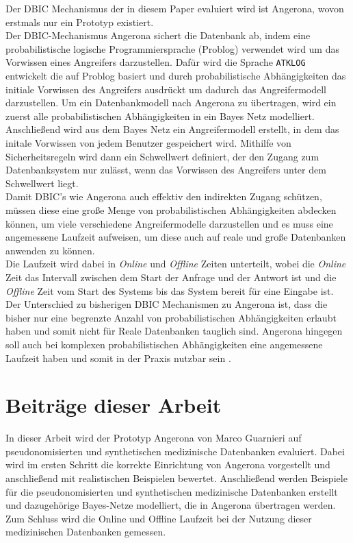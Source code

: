 \documentclass[german,version-2020-11]{uzl-thesis}
\begin{document}
Der DBIC Mechanismus der in diesem Paper evaluiert wird ist Angerona, wovon erstmals nur ein Prototyp existiert. \\ 
Der DBIC-Mechanismus Angerona sichert die Datenbank ab, indem eine probabilistische logische Programmiersprache (Problog) verwendet wird um das Vorwissen eines Angreifers darzustellen. Dafür wird die Sprache \texttt{ATKLOG} entwickelt die auf Problog basiert und durch probabilistische Abhängigkeiten das initiale Vorwissen des Angreifers ausdrückt um dadurch das Angreifermodell darzustellen. Um ein Datenbankmodell nach Angerona zu übertragen, wird ein zuerst alle probabilistischen Abhängigkeiten in ein Bayes Netz modelliert. Anschließend wird aus dem Bayes Netz ein Angreifermodell erstellt, in dem das initale Vorwissen von jedem Benutzer gespeichert wird. Mithilfe von Sicherheitsregeln wird dann ein Schwellwert definiert, der den Zugang zum Datenbanksystem nur zulässt, wenn das Vorwissen des Angreifers unter dem Schwellwert liegt. \\  
Damit DBIC's wie Angerona auch effektiv den indirekten Zugang schützen, müssen diese eine große Menge von probabilistischen Abhängigkeiten abdecken können, um viele verschiedene Angreifermodelle darzustellen und es muss eine angemessene Laufzeit aufweisen, um diese auch auf reale und große Datenbanken anwenden zu können.\\
Die Laufzeit wird dabei in \textit{Online} und \textit{Offline} Zeiten unterteilt, wobei die \textit{Online} Zeit das Intervall zwischen dem Start der Anfrage und der Antwort ist und die \textit{Offline} Zeit vom Start des Systems bis das System bereit für eine Eingabe ist. \\
Der Unterschied zu bisherigen DBIC Mechanismen zu Angerona ist, dass die bisher nur eine begrenzte Anzahl von probabilistischen Abhängigkeiten erlaubt haben und somit nicht für Reale Datenbanken tauglich sind. Angerona hingegen soll auch bei komplexen probabilistischen Abhängigkeiten eine angemessene Laufzeit haben und somit in der Praxis nutzbar sein \cite{guarnieri2017securing}. \\

\section{Beiträge dieser Arbeit}
In dieser Arbeit wird der Prototyp Angerona von Marco Guarnieri auf pseudonomisierten und synthetischen medizinische Datenbanken evaluiert. Dabei wird im ersten Schritt die korrekte Einrichtung von Angerona vorgestellt und anschließend mit realistischen Beispielen bewertet. Anschließend werden Beispiele für die pseudonomisierten und synthetischen medizinische Datenbanken erstellt und dazugehörige Bayes-Netze modelliert, die in Angerona übertragen werden.  Zum Schluss wird die Online und Offline Laufzeit bei der Nutzung dieser medizinischen Datenbanken gemessen.
\end{document}
